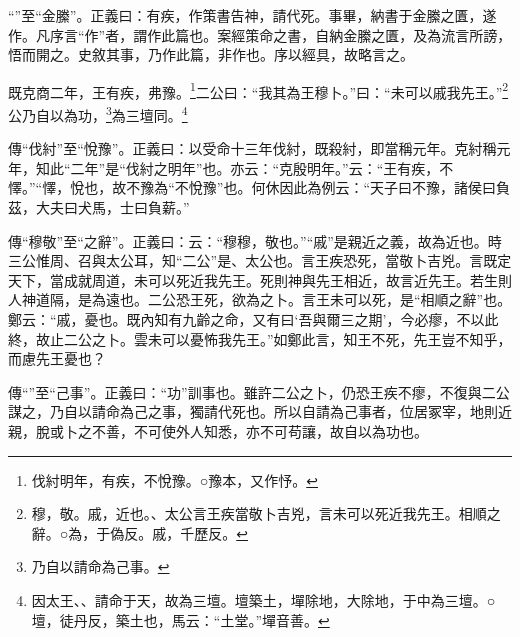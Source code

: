 {\noindent\shu{}\fzkt “”至“金縢”。正義曰：有疾，作策書告神，請代死。事畢，納書于金縢之匱，遂作。凡序言“作”者，謂作此篇也。案經策命之書，自納金縢之匱，及為流言所謗，悟而開之。史敘其事，乃作此篇，非作也。序以經具，故略言之。 \par}

既克商二年，王有疾，弗豫。\footnote{伐紂明年，有疾，不悅豫。○豫本，又作忬。}二公曰：“我其為王穆卜。”曰：“未可以戚我先王。”\footnote{穆，敬。戚，近也。、太公言王疾當敬卜吉兇，言未可以死近我先王。相順之辭。○為，于偽反。戚，千歷反。}公乃自以為功，\footnote{乃自以請命為己事。}為三壇同。\footnote{因太王、、請命于天，故為三壇。壇築土，墠除地，大除地，于中為三壇。○壇，徒丹反，築土也，馬云：“土堂。”墠音善。}

{\noindent\zhuan{}\fzbyks 傳“伐紂”至“悅豫”。正義曰：以受命十三年伐紂，既殺紂，即當稱元年。克紂稱元年，知此“二年”是“伐紂之明年”也。亦云：“克殷明年。”云：“王有疾，不懌。”“懌，悅也，故不豫為“不悅豫”也。何休因此為例云：“天子曰不豫，諸侯曰負茲，大夫曰犬馬，士曰負薪。” \par}

{\noindent\zhuan{}\fzbyks 傳“穆敬”至“之辭”。正義曰：云：“穆穆，敬也。”“戚”是親近之義，故為近也。時三公惟周、召與太公耳，知“二公”是、太公也。言王疾恐死，當敬卜吉兇。言既定天下，當成就周道，未可以死近我先王。死則神與先王相近，故言近先王。若生則人神道隔，是為遠也。二公恐王死，欲為之卜。言王未可以死，是“相順之辭”也。鄭云：“戚，憂也。既內知有九齡之命，又有曰‘吾與爾三之期’，今必瘳，不以此終，故止二公之卜。雲未可以憂怖我先王。”如鄭此言，知王不死，先王豈不知乎，而慮先王憂也？ \par}

{\noindent\zhuan{}\fzbyks 傳“”至“己事”。正義曰：“功”訓事也。雖許二公之卜，仍恐王疾不瘳，不復與二公謀之，乃自以請命為己之事，獨請代死也。所以自請為己事者，位居冢宰，地則近親，脫或卜之不善，不可使外人知悉，亦不可苟讓，故自以為功也。 \par}


